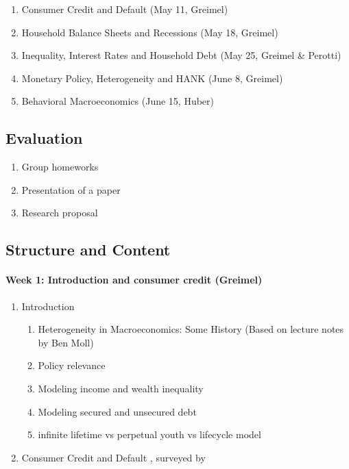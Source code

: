 \documentclass[a4paper,12pt]{article}
\begin{document}
\begin{enumerate}
\item Consumer Credit and Default (May 11, Greimel)
\item Household Balance Sheets and Recessions (May 18, Greimel)
\item Inequality, Interest Rates and Household Debt (May 25, Greimel \& Perotti)
\item Monetary Policy, Heterogeneity and HANK (June 8, Greimel)
\item Behavioral Macroeconomics (June 15, Huber)
\end{enumerate}

\subsection*{Evaluation}

\begin{enumerate}
\item Group homeworks
\item Presentation of a paper
\item Research proposal
\end{enumerate}

\subsection*{Structure and Content}

\paragraph{Week 1: Introduction and consumer credit (Greimel)}
\begin{enumerate}
\item Introduction
  \begin{enumerate}
  \item Heterogeneity in Macroeconomics: Some History (Based on lecture notes by Ben Moll)
  \item Policy relevance
  \item Modeling income and wealth inequality
  \item Modeling secured and unsecured debt
  \item infinite lifetime vs perpetual youth vs lifecycle model
  \end{enumerate}

\item Consumer Credit and Default \citep{athreya2002welfare,chatterjee2007quantitative,livshits2007consumer}, surveyed by \citet{exler2020consumer}
\end{enumerate}
\end{document}
